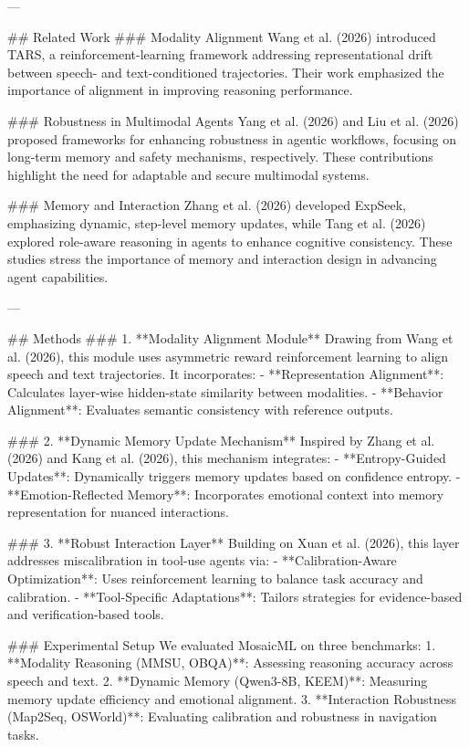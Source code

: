 ---

## Related Work
### Modality Alignment
Wang et al. (2026) introduced TARS, a reinforcement-learning framework addressing representational drift between speech- and text-conditioned trajectories. Their work emphasized the importance of alignment in improving reasoning performance.

### Robustness in Multimodal Agents
Yang et al. (2026) and Liu et al. (2026) proposed frameworks for enhancing robustness in agentic workflows, focusing on long-term memory and safety mechanisms, respectively. These contributions highlight the need for adaptable and secure multimodal systems.

### Memory and Interaction
Zhang et al. (2026) developed ExpSeek, emphasizing dynamic, step-level memory updates, while Tang et al. (2026) explored role-aware reasoning in agents to enhance cognitive consistency. These studies stress the importance of memory and interaction design in advancing agent capabilities.

---

## Methods
### 1. **Modality Alignment Module**
Drawing from Wang et al. (2026), this module uses asymmetric reward reinforcement learning to align speech and text trajectories. It incorporates:
- **Representation Alignment**: Calculates layer-wise hidden-state similarity between modalities.
- **Behavior Alignment**: Evaluates semantic consistency with reference outputs.

### 2. **Dynamic Memory Update Mechanism**
Inspired by Zhang et al. (2026) and Kang et al. (2026), this mechanism integrates:
- **Entropy-Guided Updates**: Dynamically triggers memory updates based on confidence entropy.
- **Emotion-Reflected Memory**: Incorporates emotional context into memory representation for nuanced interactions.

### 3. **Robust Interaction Layer**
Building on Xuan et al. (2026), this layer addresses miscalibration in tool-use agents via:
- **Calibration-Aware Optimization**: Uses reinforcement learning to balance task accuracy and calibration.
- **Tool-Specific Adaptations**: Tailors strategies for evidence-based and verification-based tools.

### Experimental Setup
We evaluated MosaicML on three benchmarks:
1. **Modality Reasoning (MMSU, OBQA)**: Assessing reasoning accuracy across speech and text.
2. **Dynamic Memory (Qwen3-8B, KEEM)**: Measuring memory update efficiency and emotional alignment.
3. **Interaction Robustness (Map2Seq, OSWorld)**: Evaluating calibration and robustness in navigation tasks.

